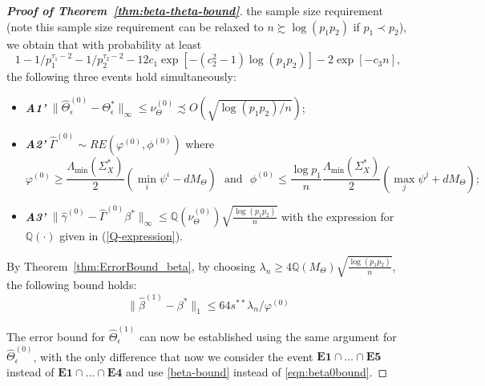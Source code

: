 \begin{proof}[\textbf{Proof of Theorem~\ref{thm:beta-theta-bound}}]
the sample size requirement (note this sample size requirement can be relaxed to $n\succsim \log(p_1p_2)$ if $p_1\prec p_2$), we obtain that with probability at least
\begin{equation*}
1-1/p_1^{\tau_1-2} - 1/p_2^{\tau_2-2} - 12c_1\exp[-(c^2_2-1)\log (p_1p_2)] - 2\exp[-c_3n], 
\end{equation*}
the following three events hold simultaneously: 
\begin{itemize}
\item[] \textbf{\em A1'} $\|\widehat{\Theta}^{(0)}_\epsilon-\Theta^*_\epsilon\|_\infty\leq \nu_\Theta^{(0)}\precsim O(\sqrt{\log(p_1p_2)/n})$;
\item[] \textbf{\em A2'} $\widehat{\Gamma}^{(0)}\sim RE(\varphi^{(0)},\phi^{(0)})$ where
\begin{equation*}
\varphi^{(0)} \geq \frac{\Lambda_{\min}(\Sigma^*_X)}{2}(\min_i\psi^i - dM_\Theta)~~~\text{and} ~~~ \phi^{(0)} \leq \frac{\log p_1}{n}\frac{\Lambda_{\min}(\Sigma^*_X)}{2}(\max_j\psi^j + dM_\Theta);
\end{equation*}
\item[] \textbf{\em A3'} $\|\widehat{\gamma}^{(0)}-\widehat{\Gamma}^{(0)}\beta^*\|_\infty \leq \mathbb{Q}(\nu_\Theta^{(0)})\sqrt{\frac{\log(p_1p_2)}{n}}$ with the expression for $\mathbb{Q}(\cdot)$ given in (\ref{Q-expression}).
\end{itemize}
By Theorem~\ref{thm:ErrorBound_beta}, by choosing $\lambda_n\geq 4\mathbb{Q}(M_\Theta)\sqrt{\frac{\log(p_1p_2)}{n}}$, the following bound holds:
\begin{equation}\label{beta-bound}
\|\widehat{\beta}^{(1)}-\beta^*\|_1 \leq 64s^{**}\lambda_n/\varphi^{(0)}
\end{equation}

The error bound for $\widehat{\Theta}^{(1)}_\epsilon$ can now be established using the same argument for $\hat{\Theta}^{(0)}_\epsilon$, with the only difference that now we consider the event $\mathbf{E1} \cap \ldots \cap \mathbf{E5}$ instead of $\mathbf{E1} \cap \ldots \cap \mathbf{E4}$ and use \eqref{beta-bound} instead of \eqref{eqn:beta0bound}.


\end{proof}
